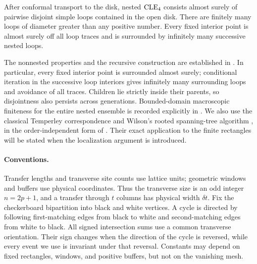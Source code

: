 \begin{proposition}
\label{prop:cle-facts}
After conformal transport to the disk, nested \(\mathrm{CLE}_4\) consists almost
surely of pairwise disjoint simple loops contained in the open disk.
There are finitely many loops of diameter greater than any positive
number. Every fixed interior point is almost surely off all loop traces
and is surrounded by infinitely many successive nested loops.
\end{proposition}

The nonnested properties and the recursive construction are established in
\cite[Sections~2.1--2.2]{SW}. In particular, every fixed interior point is
surrounded almost surely; conditional iteration in the successive loop
interiors gives infinitely many surrounding loops and avoidance of all
traces. Children lie strictly inside their parents, so disjointness also
persists across generations. Bounded-domain macroscopic finiteness for the
entire nested ensemble is recorded explicitly in \cite[p.~2788]{BC}.
We also use the classical Temperley correspondence \cite[Theorem~1]{KPW}
and Wilson's rooted spanning-tree algorithm \cite{Wilson}, in the
order-independent form of \cite[Theorems~13 and~16]{PW}.
Their exact application to the finite rectangles will be stated when the
localization argument is introduced.

\paragraph{Conventions.}
Transfer lengths and transverse site counts use lattice units; geometric
windows and buffers use physical coordinates. Thus the transverse size is
an odd integer \(n=2p+1\), and a transfer through \(t\) columns has physical
width \(\delta t\). Fix the checkerboard bipartition into black and white
vertices. A cycle is directed by following first-matching edges from
black to white and second-matching edges from white to black. All signed
intersection sums use a common transverse orientation. Their sign changes
when the direction of the cycle is reversed, while every event we use is
invariant under that reversal. Constants may depend on fixed rectangles,
windows, and positive buffers, but not on the vanishing mesh.

